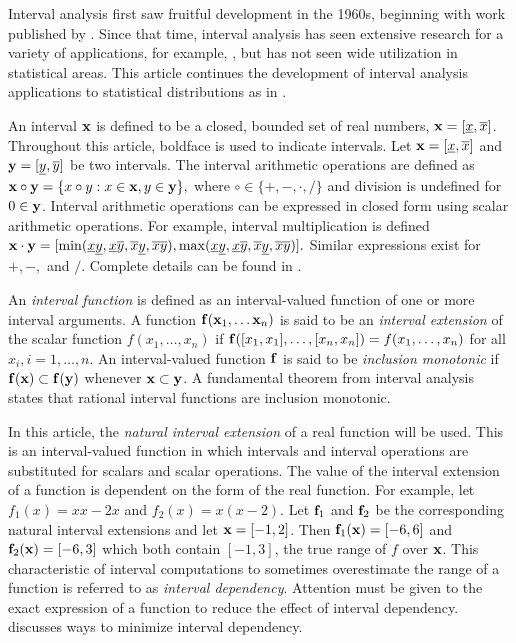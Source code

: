 \documentclass[10pt,letterpaper]{article}
\begin{document}
Interval analysis first saw fruitful development in the 1960s, beginning
with work published by \cite{Moore66}.  Since that time, interval analysis has
seen extensive research for a variety of applications, for example,
\cite{HansenBook}, but has not seen wide utilization in statistical areas.  
This article continues the development of interval analysis applications to
statistical distributions as in \cite{WangKennedyJASA}.

An interval ${\bf x}$ is defined to be a closed, bounded set of real numbers,
$ {\bf x} = [\underline{x}, \overline{x}]$.  Throughout this article, boldface
is used to indicate intervals.  
Let ${\bf x} = [\underline{x}, \overline{x}]$ and 
${\bf y} = [\underline{y}, \overline{y}]$ 
be two  intervals.  The interval arithmetic
operations are defined as 
${\bf x} \circ {\bf y} = \{ x \circ y : x \in {\bf x}, y \in {\bf y}\},$
where $\circ \in \{+, -, \cdot, / \}$ and division is undefined 
for $0 \in {\bf y}$.
Interval arithmetic operations can be expressed in closed form using scalar
arithmetic operations.  For example, interval multiplication is defined
${\bf x} \cdot {\bf y} =
[\min(\underline{x}\underline{y},\underline{x}\overline{y},
\overline{x}\underline{y}, \overline{x}\overline{y}),
\max(\underline{x}\underline{y},\underline{x}\overline{y},
\overline{x}\underline{y}, \overline{x}\overline{y})].$
Similar expressions exist for $+, -,$ and $/$.  Complete details can be found
in \cite{Moore79}.

An {\it interval function} is defined as an interval-valued function of one or more
interval arguments.  A function ${\bf f}({\bf x}_1, \ldots {\bf x}_n)$ is said
to be an {\it interval extension} of the scalar function
$f(x_1, \ldots, x_n)$ if
${\bf f}([x_1,x_1], \ldots, [x_n,x_n]) = f(x_1, \ldots, x_n)$
for all $x_i, i=1,\ldots,n$.
An interval-valued function ${\bf f}$ is said to be 
{\it inclusion monotonic} if 
${\bf f(x) \subset f(y)}$ whenever ${\bf x \subset y}$.
A fundamental theorem from interval analysis states that rational interval
functions are inclusion monotonic.

In this article, the {\it natural interval extension} of a real function 
will be used.  This is an interval-valued function
in which intervals and interval operations 
are substituted for scalars and scalar operations.
The value of the interval extension of 
a function
is dependent on the form of the real function.  For example,
let $f_1 (x) = xx - 2x$ and 
$f_2 (x) = x(x-2)$.
Let ${\bf f}_1$ and ${\bf f}_2$ be the corresponding natural interval
extensions and let ${\bf x} = [-1,2]$.  Then
${\bf f}_1({\bf x}) = [-6, 6]$ and
${\bf f}_2({\bf x}) = [-6, 3]$
which both contain $[-1, 3]$, the true range of $f$ over ${\bf x}$.
This characteristic of interval computations to sometimes
overestimate the range of a function
is referred to as {\it interval dependency}.  Attention must be given to the
exact expression of a function to reduce the effect of interval dependency.
\cite{HansenSharp} discusses ways to minimize interval dependency.
\end{document}
